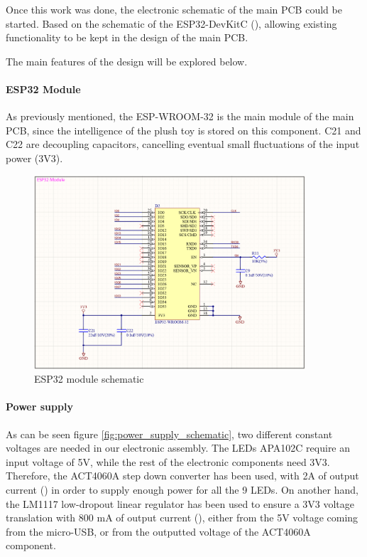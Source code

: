 Once this work was done, the electronic schematic of the main PCB could be started. Based on the schematic of the ESP32-DevKitC (\cite{esp32devkitcschematic}), allowing existing functionality to be kept in the design of the main PCB. 

\medskip The main features of the design will be explored below.

\paragraph{ESP32 Module} As previously mentioned, the ESP-WROOM-32 is the main module of the main PCB, since the intelligence of the plush toy is stored on this component. C21 and C22 are decoupling capacitors, cancelling eventual small fluctuations of the input power (3V3).

\begin{figure}[H]
    \centering
    \includegraphics[width=0.9\textwidth]{images/EE_ESP32Module.PNG}
    \caption{ESP32 module schematic}
    \label{fig:ESP32_module_schematic}
\end{figure}

\paragraph{Power supply} As can be seen figure \ref{fig:power_supply_schematic}, two different constant voltages are needed in our electronic assembly. The LEDs APA102C require an input voltage of 5V, while the rest of the electronic components need 3V3. Therefore, the ACT4060A step down converter has been used, with 2A of output current (\cite{act4060adatasheet}) in order to supply enough power for all the 9 LEDs. On another hand, the LM1117 low-dropout linear regulator has been used to ensure a 3V3 voltage translation with 800 mA of output current (\cite{lm1117datasheet}), either from the 5V voltage coming from the micro-USB, or from the outputted voltage of the ACT4060A component.

